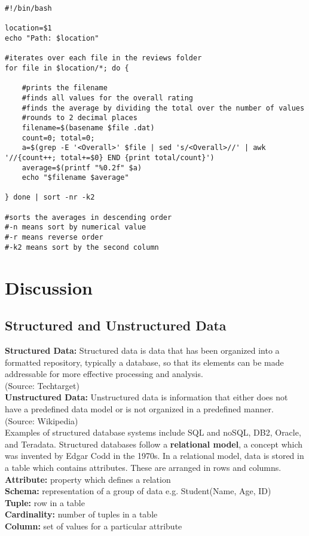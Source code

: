 \documentclass[12pt]{article}
\begin{document}
\begin{lstlisting}
#!/bin/bash

location=$1
echo "Path: $location"

#iterates over each file in the reviews folder
for file in $location/*; do {

    #prints the filename
    #finds all values for the overall rating
    #finds the average by dividing the total over the number of values
    #rounds to 2 decimal places
    filename=$(basename $file .dat)
	count=0; total=0;
	a=$(grep -E '<Overall>' $file | sed 's/<Overall>//' | awk '//{count++; total+=$0} END {print total/count}')
	average=$(printf "%0.2f" $a)
	echo "$filename $average"

} done | sort -nr -k2 

#sorts the averages in descending order
#-n means sort by numerical value
#-r means reverse order
#-k2 means sort by the second column

\end{lstlisting}

\newpage
\section{Discussion}
\subsection{Structured and Unstructured Data}
\textbf{Structured Data:} 
Structured data is data that has been organized into a formatted repository, typically a database, so that its elements can be made addressable for more effective processing and analysis. \\
(Source: Techtarget) \\
\textbf{Unstructured Data:}
Unstructured data is information that either does not have a predefined data model or is not organized in a predefined manner. \\
(Source: Wikipedia) \\

Examples of structured database systems include SQL and noSQL, DB2, Oracle, and Teradata. Structured databases follow a \textbf{relational model}, a concept which was invented by Edgar Codd in the 1970s. In a relational model, data is stored in a table which contains attributes. These are arranged in rows and columns. \\

\textbf{Attribute:} property which defines a relation \\
\textbf{Schema:} representation of a group of data e.g. Student(Name, Age, ID) \\
\textbf{Tuple:} row in a table \\
\textbf{Cardinality:} number of tuples in a table \\
\textbf{Column:} set of values for a particular attribute
\end{document}
